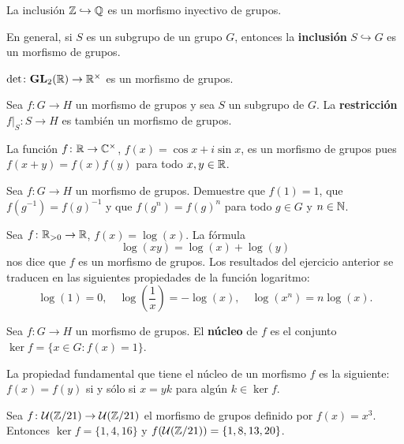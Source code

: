 \begin{example}
La inclusión $\mathbb{Z}\hookrightarrow\mathbb{Q}$ es un morfismo inyectivo de grupos. 
\end{example}

En general, si $S$ es un subgrupo de un grupo $G$, entonces
la \textbf{inclusión} $S\hookrightarrow G$ es un morfismo de grupos. 

\begin{example}
$\det\colon\mathbf{GL}_2(\mathbb{R})\to\mathbb{R}^\times$ es un morfismo de grupos.
\end{example}

\begin{example}
	Sea $f\colon G\to H$ un morfismo de grupos y sea $S$ un subgrupo de $G$. 
	La \textbf{restricción} $f|_S\colon S\to H$ es también un morfismo de grupos.
\end{example}

\begin{example}
La función $f\colon\mathbb{R}\to\mathbb{C}^\times$, $f(x)=\cos x+i\sin x$, es un morfismo de grupos pues
$f(x+y)=f(x)f(y)$ para todo $x,y\in\mathbb{R}$. 
\end{example}

\begin{exercise}
Sea $f\colon G\to H$ un morfismo de grupos. Demuestre que $f(1)=1$, que $f(g^{-1})=f(g)^{-1}$ y que  $f(g^n)=f(g)^n$ para todo $g\in G$ y $n\in\mathbb{N}$.  
\end{exercise}

\begin{example}
Sea $f\colon\mathbb{R}_{>0}\to\mathbb{R}$, $f(x)=\log(x)$. La fórmula 
\[\log(xy)=\log(x)+
\log(y)
\]
nos dice que $f$ es un morfismo de grupos. Los resultados del ejercicio anterior
se traducen en las siguientes propiedades de la función logaritmo: 
\[
\log(1)=0,
\quad
\log\left(\frac{1}{x}\right)=-\log(x),
\quad
\log(x^n)=n\log(x).
\] 
\end{example}

\begin{definition}
	Sea $f\colon G\to H$ un morfismo de grupos. El \textbf{núcleo} de $f$ 
	es el conjunto
	$\ker f=\{x\in G:f(x)=1\}$. 
\end{definition}

La propiedad fundamental que tiene el núcleo de un morfismo $f$ es la siguiente: $f(x)=f(y)$ si y sólo si $x=yk$ para algún $k\in\ker f$. 

\begin{example}
Sea $f\colon\mathcal{U}(\mathbb{Z}/21)\to\mathcal{U}(\mathbb{Z}/21)$ el morfismo de grupos definido por $f(x)=x^3$. Entonces 
$\ker f=\{1,4,16\}$ y $f(\mathcal{U}(\mathbb{Z}/21))=\{1,8,13,20\}$. 
\end{example}


